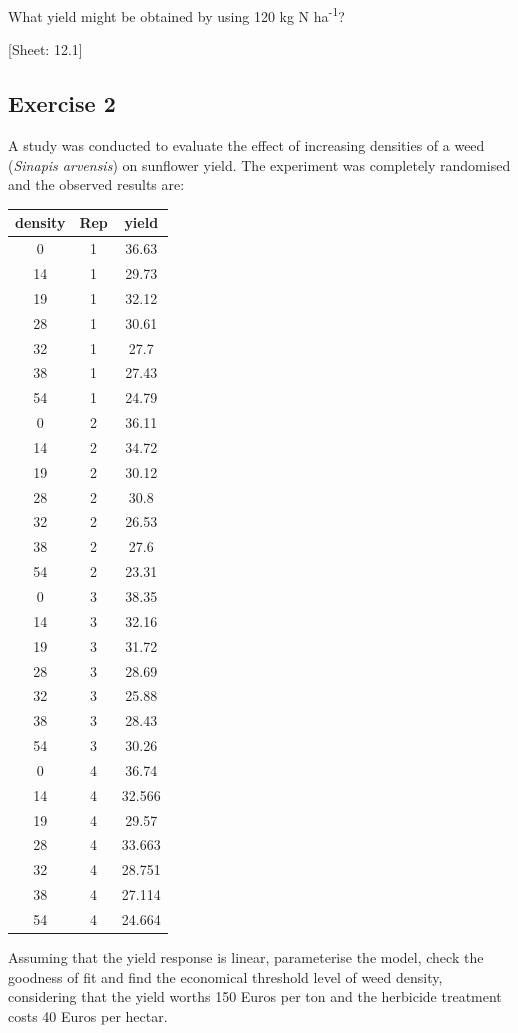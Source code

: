 \documentclass[a4paper,12pt,oneside]{book}
\begin{document}
What yield might be obtained by using 120 kg N ha\textsuperscript{-1}?

{[}Sheet: 12.1{]}

\hypertarget{exercise-2-8}{%
\subsection{Exercise 2}\label{exercise-2-8}}

A study was conducted to evaluate the effect of increasing densities of a weed (\emph{Sinapis arvensis}) on sunflower yield. The experiment was completely randomised and the observed results are:

\begin{longtable}[]{@{}ccc@{}}
\toprule()
density & Rep & yield \\
\midrule()
\endhead
0 & 1 & 36.63 \\
14 & 1 & 29.73 \\
19 & 1 & 32.12 \\
28 & 1 & 30.61 \\
32 & 1 & 27.7 \\
38 & 1 & 27.43 \\
54 & 1 & 24.79 \\
0 & 2 & 36.11 \\
14 & 2 & 34.72 \\
19 & 2 & 30.12 \\
28 & 2 & 30.8 \\
32 & 2 & 26.53 \\
38 & 2 & 27.6 \\
54 & 2 & 23.31 \\
0 & 3 & 38.35 \\
14 & 3 & 32.16 \\
19 & 3 & 31.72 \\
28 & 3 & 28.69 \\
32 & 3 & 25.88 \\
38 & 3 & 28.43 \\
54 & 3 & 30.26 \\
0 & 4 & 36.74 \\
14 & 4 & 32.566 \\
19 & 4 & 29.57 \\
28 & 4 & 33.663 \\
32 & 4 & 28.751 \\
38 & 4 & 27.114 \\
54 & 4 & 24.664 \\
\bottomrule()
\end{longtable}

Assuming that the yield response is linear, parameterise the model, check the goodness of fit and find the economical threshold level of weed density, considering that the yield worths 150 Euros per ton and the herbicide treatment costs 40 Euros per hectar.
\end{document}

